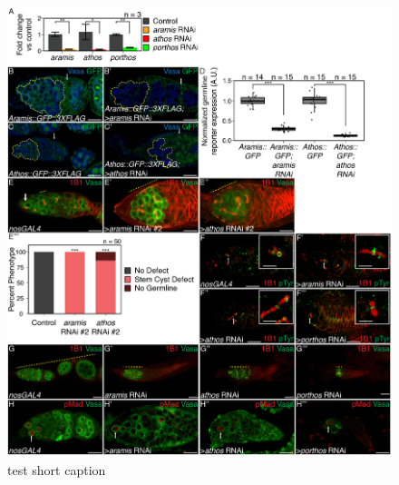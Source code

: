 \documentclass[12pt,oneside]{reedthesis}
\begin{document}
\begin{figure}

{\centering \includegraphics[width=6.5 in,height=8.9375 in]{./figure/Ribosome Biogenesis/Ribosome Biogenesis 1S} 

}

\caption[test short caption]{test short caption}\label{fig:unnamed-chunk-7}
\end{figure}
\end{document}
